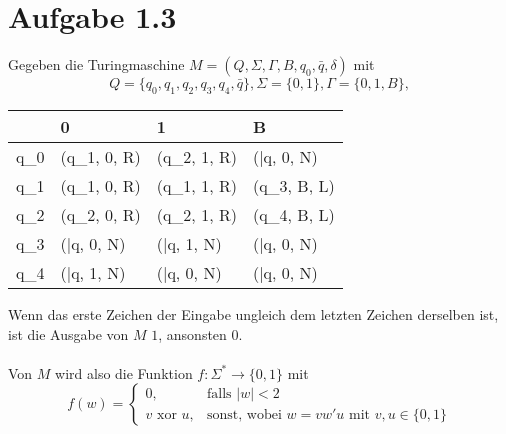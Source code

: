\documentclass[11pt, oneside]{article}   	%
\begin{document}
\section*{Aufgabe 1.3}
Gegeben die Turingmaschine $M = (Q, \Sigma, \Gamma, B, q_0, \bar{q}, \delta)$ mit
$$
	Q = \{q_0, q_1, q_2, q_3, q_4, \bar{q}\},
	\Sigma = \{0, 1\},
	\Gamma = \{0, 1, B\},
$$
\begin{center}
\begin{tabular}{L|LLL}
	\delta & 0 & 1 & B \\
	\hline
	q_0 & (q_1, 0, R) & (q_2, 1, R) & (\bar{q}, 0, N) \\
	q_1 & (q_1, 0, R) & (q_1, 1, R) & (q_3, B, L) \\
	q_2 & (q_2, 0, R) & (q_2, 1, R) & (q_4, B, L) \\
	q_3 & (\bar{q}, 0, N) & (\bar{q}, 1, N) & (\bar{q}, 0, N) \\
	q_4 & (\bar{q}, 1, N) & (\bar{q}, 0, N) & (\bar{q}, 0, N)
\end{tabular}
\end{center}
Wenn das erste Zeichen der Eingabe ungleich dem letzten Zeichen derselben ist, ist die Ausgabe von $M$ $1$, ansonsten $0$.\\\\
Von $M$ wird also die Funktion $f : \Sigma^* \rightarrow \{0, 1\}$ mit
\[
f(w) =
\begin{cases}
	0, &\text{falls } |w| < 2\\
	v \text{ xor } u, &\text{sonst, wobei } w = vw'u \text{ mit } v, u \in \{0, 1\}
\end{cases}
\]
\end{document}
